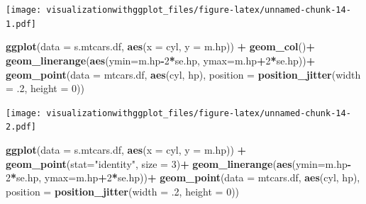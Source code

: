 \documentclass[]{krantz}
\makeatletter
\newenvironment{Shaded}{\begin{snugshade}}{\end{snugshade}}
\newcommand{\KeywordTok}[1]{\textcolor[rgb]{0.13,0.29,0.53}{\textbf{#1}}}
\newcommand{\DataTypeTok}[1]{\textcolor[rgb]{0.13,0.29,0.53}{#1}}
\newcommand{\DecValTok}[1]{\textcolor[rgb]{0.00,0.00,0.81}{#1}}
\newcommand{\StringTok}[1]{\textcolor[rgb]{0.31,0.60,0.02}{#1}}
\newcommand{\OperatorTok}[1]{\textcolor[rgb]{0.81,0.36,0.00}{\textbf{#1}}}
\newcommand{\NormalTok}[1]{#1}
\newenvironment{kframe}{%
\medskip{}
\setlength{\fboxsep}{.8em}
 \def\at@end@of@kframe{}%
 \ifinner\ifhmode%
  \def\at@end@of@kframe{\end{minipage}}%
  \begin{minipage}{\columnwidth}%
 \fi\fi%
 \def\FrameCommand##1{\hskip\@totalleftmargin \hskip-\fboxsep
 \colorbox{shadecolor}{##1}\hskip-\fboxsep
     \hskip-\linewidth \hskip-\@totalleftmargin \hskip\columnwidth}%
 \MakeFramed {\advance\hsize-\width
   \@totalleftmargin\z@ \linewidth\hsize
   \@setminipage}}%
 {\par\unskip\endMakeFramed%
 \at@end@of@kframe}
\renewenvironment{Shaded}{\begin{kframe}}{\end{kframe}}
\theoremstyle{definition}
\theoremstyle{definition}
\theoremstyle{definition}
\theoremstyle{remark}
\makeatother
\begin{document}
\texttt{[image: visualizationwithggplot\_files/figure-latex/unnamed-chunk-14-1.pdf]}

\begin{Shaded}
\begin{Highlighting}[]
\KeywordTok{ggplot}\NormalTok{(}\DataTypeTok{data =}\NormalTok{ s.mtcars.df, }\KeywordTok{aes}\NormalTok{(}\DataTypeTok{x =}\NormalTok{ cyl, }\DataTypeTok{y =}\NormalTok{ m.hp)) }\OperatorTok{+}
\StringTok{  }\KeywordTok{geom_col}\NormalTok{()}\OperatorTok{+}
\StringTok{  }\KeywordTok{geom_linerange}\NormalTok{(}\KeywordTok{aes}\NormalTok{(}\DataTypeTok{ymin=}\NormalTok{m.hp}\OperatorTok{-}\DecValTok{2}\OperatorTok{*}\NormalTok{se.hp, }\DataTypeTok{ymax=}\NormalTok{m.hp}\OperatorTok{+}\DecValTok{2}\OperatorTok{*}\NormalTok{se.hp))}\OperatorTok{+}
\StringTok{  }\KeywordTok{geom_point}\NormalTok{(}\DataTypeTok{data =}\NormalTok{ mtcars.df, }\KeywordTok{aes}\NormalTok{(cyl, hp), }\DataTypeTok{position =} \KeywordTok{position_jitter}\NormalTok{(}\DataTypeTok{width =}\NormalTok{ .}\DecValTok{2}\NormalTok{, }\DataTypeTok{height =} \DecValTok{0}\NormalTok{))}
\end{Highlighting}
\end{Shaded}

\texttt{[image: visualizationwithggplot\_files/figure-latex/unnamed-chunk-14-2.pdf]}

\begin{Shaded}
\begin{Highlighting}[]
\KeywordTok{ggplot}\NormalTok{(}\DataTypeTok{data =}\NormalTok{ s.mtcars.df, }\KeywordTok{aes}\NormalTok{(}\DataTypeTok{x =}\NormalTok{ cyl, }\DataTypeTok{y =}\NormalTok{ m.hp)) }\OperatorTok{+}
\StringTok{  }\KeywordTok{geom_point}\NormalTok{(}\DataTypeTok{stat=}\StringTok{"identity"}\NormalTok{, }\DataTypeTok{size =} \DecValTok{3}\NormalTok{)}\OperatorTok{+}
\StringTok{  }\KeywordTok{geom_linerange}\NormalTok{(}\KeywordTok{aes}\NormalTok{(}\DataTypeTok{ymin=}\NormalTok{m.hp}\OperatorTok{-}\DecValTok{2}\OperatorTok{*}\NormalTok{se.hp, }\DataTypeTok{ymax=}\NormalTok{m.hp}\OperatorTok{+}\DecValTok{2}\OperatorTok{*}\NormalTok{se.hp))}\OperatorTok{+}
\StringTok{  }\KeywordTok{geom_point}\NormalTok{(}\DataTypeTok{data =}\NormalTok{ mtcars.df, }\KeywordTok{aes}\NormalTok{(cyl, hp), }\DataTypeTok{position =} \KeywordTok{position_jitter}\NormalTok{(}\DataTypeTok{width =}\NormalTok{ .}\DecValTok{2}\NormalTok{, }\DataTypeTok{height =} \DecValTok{0}\NormalTok{))}
\end{Highlighting}
\end{Shaded}
\end{document}

